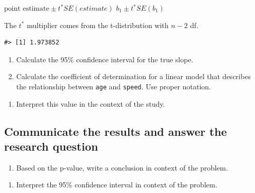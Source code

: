 \documentclass[
]{report}
\providecommand{\tightlist}{%
  \setlength{\itemsep}{0pt}\setlength{\parskip}{0pt}}
\begin{document}
\(\mbox{point estimate}\pm t^*SE(estimate)\)
\(b_1 \pm t^* SE(b_1)\)

The \(t^*\) multiplier comes from the t-distribution with \(n-2\) df.

\begin{verbatim}
#> [1] 1.973852
\end{verbatim}

\begin{enumerate}
\def\labelenumi{\arabic{enumi}.}
\setcounter{enumi}{16}
\item
  Calculate the 95\% confidence interval for the true slope.
  \vspace{1in}
\item
  Calculate the coefficient of determination for a linear model that describes the relationship between \texttt{age} and \texttt{speed}. Use proper notation.
\end{enumerate}

\vspace{1in}

\begin{enumerate}
\def\labelenumi{\arabic{enumi}.}
\setcounter{enumi}{18}
\tightlist
\item
  Interpret this value in the context of the study.
\end{enumerate}

\vspace{1in}

\hypertarget{communicate-the-results-and-answer-the-research-question}{%
\subsection{Communicate the results and answer the research question}\label{communicate-the-results-and-answer-the-research-question}}

\begin{enumerate}
\def\labelenumi{\arabic{enumi}.}
\setcounter{enumi}{19}
\tightlist
\item
  Based on the p-value, write a conclusion in context of the problem.
\end{enumerate}

\vspace{1in}

\begin{enumerate}
\def\labelenumi{\arabic{enumi}.}
\setcounter{enumi}{20}
\tightlist
\item
  Interpret the 95\% confidence interval in context of the problem.
\end{enumerate}
\end{document}

